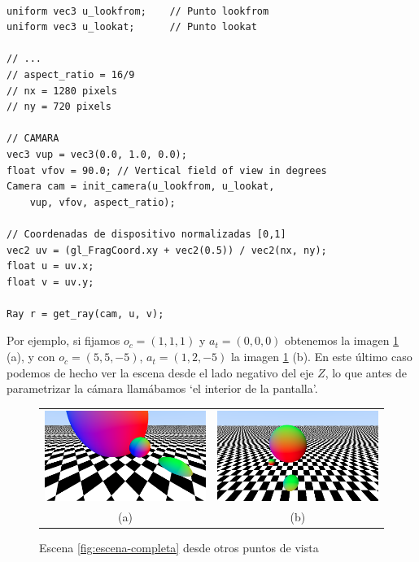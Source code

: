 \begin{lstlisting}

uniform vec3 u_lookfrom;    // Punto lookfrom
uniform vec3 u_lookat;      // Punto lookat

// ... 
// aspect_ratio = 16/9
// nx = 1280 pixels
// ny = 720 pixels

// CAMARA
vec3 vup = vec3(0.0, 1.0, 0.0);
float vfov = 90.0; // Vertical field of view in degrees
Camera cam = init_camera(u_lookfrom, u_lookat, 
    vup, vfov, aspect_ratio);

// Coordenadas de dispositivo normalizadas [0,1]
vec2 uv = (gl_FragCoord.xy + vec2(0.5)) / vec2(nx, ny);
float u = uv.x;
float v = uv.y;

Ray r = get_ray(cam, u, v);
\end{lstlisting}

Por ejemplo, si fijamos $o_c = (1,1,1)$ y $a_t = (0,0,0)$ obtenemos la imagen \ref{fig:escena-camara} (a), y con $o_c=(5, 5, -5)$, $a_t=(1,2,-5)$ la imagen \ref{fig:escena-camara} (b). En este último caso podemos de hecho ver la escena desde el lado negativo del eje $Z$, lo que antes de parametrizar la cámara llamábamos `el interior de la pantalla'.

\begin{figure}[ht]
    \centering
    \begin{tabular}{cc}
          \includegraphics[scale=0.25]{img/C8/camera-1.png} &   \includegraphics[scale=0.25]{img/C8/camera-2.png} \\
    (a) & (b)\\[6pt]
    \end{tabular}
    \caption{Escena \ref{fig:escena-completa} desde otros puntos de vista}
    \label{fig:escena-camara}
\end{figure}

